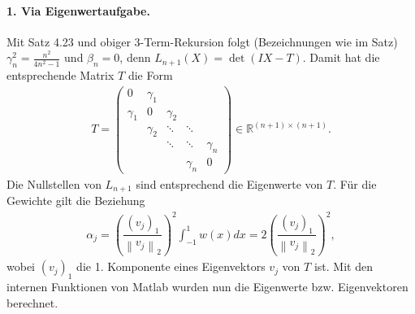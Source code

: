 \documentclass[french, 12pt, a4paper, onesided]{scrartcl}
\theoremstyle{plain}
\theoremstyle{definition}
\theoremstyle{remark}
\newcommand{\R}{\mathbb{R}}
\newcommand{\norm}[2][]{\left\|#2\right\|_{#1}}
\begin{document}
\paragraph{1. Via Eigenwertaufgabe.} Mit Satz 4.23 und obiger 3-Term-Rekursion folgt (Bezeichnungen wie im Satz) $ \gamma_n^2=\frac{n^2}{4n^2-1} $ und $ \beta_n=0 $, denn $ L_{n+1}(X)=\det(IX-T) $. Damit hat die entsprechende Matrix $ T $ die Form
\begin{align*}
	T=\left( \begin{array}{ccccc}
	0 & \gamma_1 &  &  &  \\ 
	\gamma_1 & 0 & \gamma_2 &  &  \\ 
	& \gamma_2 & \ddots & \ddots &  \\ 
	&  & \ddots & \ddots & \gamma_n \\ 
	&  &  & \gamma_n & 0
	\end{array} \right) \in \R^{(n+1)\times(n+1)}.
\end{align*}
Die Nullstellen von $ L_{n+1} $ sind entsprechend die Eigenwerte von $ T $. Für die Gewichte gilt die Beziehung
\begin{align}
	\alpha_j=\left( \dfrac{(v_j)_1}{\norm[2]{v_j}} \right)^2 \int_{-1}^1w(x)dx=2\left( \dfrac{(v_j)_1}{\norm[2]{v_j}} \right)^2,
\end{align}
wobei $ (v_j)_1 $ die 1. Komponente eines Eigenvektors $ v_j $ von $ T $ ist.
\newline
Mit den internen Funktionen von Matlab wurden nun die Eigenwerte bzw. Eigenvektoren berechnet.
\end{document}
